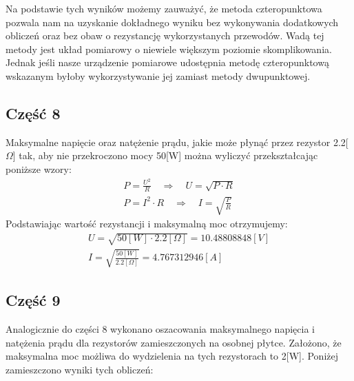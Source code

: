 \documentclass[11pt]{article}
\begin{document}
    Na podstawie tych wyników możemy zauważyć, że metoda czteropunktowa pozwala nam na uzyskanie dokładnego wyniku
    bez wykonywania dodatkowych obliczeń oraz bez obaw o rezystancję wykorzystanych przewodów. Wadą tej metody jest układ
    pomiarowy o niewiele większym poziomie skomplikowania. Jednak jeśli nasze urządzenie pomiarowe udostępnia metodę
    czteropunktową wskazanym byłoby wykorzystywanie jej zamiast metody dwupunktowej.
    
    \subsection*{Część 8}
    Maksymalne napięcie oraz natężenie prądu, jakie może płynąć przez rezystor 2.2[$\Omega$]
    tak, aby nie przekroczono mocy 50[W] można wyliczyć przekształcając poniższe wzory:
    \begin{gather*}
        P=\frac{U^2}{R}\quad\Rightarrow\quad U=\sqrt{P\cdot R}\\
        P=I^2\cdot R\quad\Rightarrow\quad I=\sqrt{\frac{P}{R}}
    \end{gather*}
    Podstawiając wartość rezystancji i maksymalną moc otrzymujemy:
    \begin{gather*}
        U=\sqrt{50[W]\cdot 2.2[\Omega]}=10.48808848[V]\\
        I=\sqrt{\frac{50[W]}{2.2[\Omega]}}=4.767312946[A]
    \end{gather*}
    
    \subsection*{Część 9}
    Analogicznie do części 8 wykonano oszacowania maksymalnego napięcia i natężenia prądu dla rezystorów
    zamieszczonych na osobnej płytce. Założono, że  maksymalna moc możliwa do
    wydzielenia na tych rezystorach to 2[W]. Poniżej zamieszczono wyniki tych obliczeń:
    \begin{center}
    \end{center}
\end{document}
